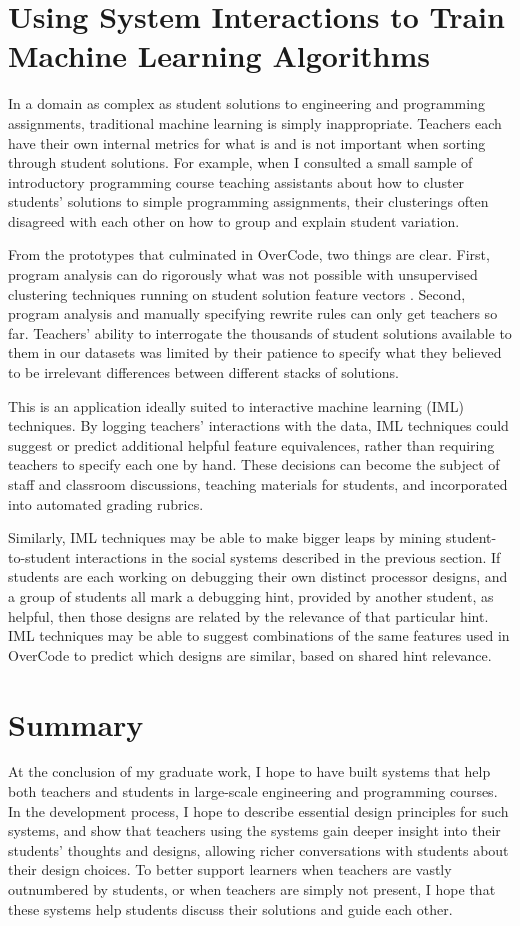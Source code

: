 \documentclass{sigchi}
\begin{document}
\section{Using System Interactions to Train Machine Learning Algorithms}

In a domain as complex as student solutions to engineering and programming assignments, traditional machine learning is simply inappropriate. Teachers each have their own internal metrics for what is and is not important when sorting through student solutions. For example, when I consulted a small sample of introductory programming course teaching assistants about how to cluster students' solutions to simple programming assignments, their clusterings often disagreed with each other on how to group and explain student variation.

From the prototypes that culminated in OverCode, two things are clear. First, program analysis can do rigorously what was not possible with unsupervised clustering techniques running on student solution feature vectors \cite{GlassmanCHIWkshop}. Second, program analysis and manually specifying rewrite rules can only get teachers so far. Teachers' ability to interrogate the thousands of student solutions available to them in our datasets was limited by their patience to specify what they believed to be irrelevant differences between different stacks of solutions. 

This is an application ideally suited to interactive machine learning (IML) techniques. By logging teachers' interactions with the data, IML techniques could suggest or predict additional helpful feature equivalences, rather than requiring teachers to specify each one by hand. These decisions can become the subject of staff and classroom discussions, teaching materials for students, and incorporated into automated grading rubrics. 

Similarly, IML techniques may be able to make bigger leaps by mining student-to-student interactions in the social systems described in the previous section. If students are each working on debugging their own distinct processor designs, and a group of students all mark a debugging hint, provided by another student, as helpful, then those designs are related by the relevance of that particular hint. IML techniques may be able to suggest combinations of the same features used in OverCode to predict which designs are similar, based on shared hint relevance.

\section{Summary}
At the conclusion of my graduate work, I hope to have built systems that help both teachers and students in large-scale engineering and programming courses. In the development process, I hope to describe essential design principles for such systems, and show that teachers using the systems gain deeper insight into their students' thoughts and designs, allowing richer conversations with students about their design choices. To better support learners when teachers are vastly outnumbered by students, or when teachers are simply not present, I hope that these systems help students discuss their solutions and guide each other.
\end{document}
